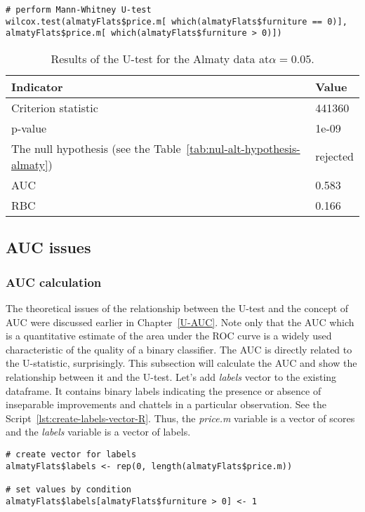 \documentclass[]{scrreprt}
\begin{document}
%
\begin{lstlisting}[float=htp, caption = Running a U-test for data from the city of Almaty., firstnumber=1, label= lst:U-test-R]
# perform Mann-Whitney U-test
wilcox.test(almatyFlats$price.m[ which(almatyFlats$furniture == 0)],
almatyFlats$price.m[ which(almatyFlats$furniture > 0)]) 
\end{lstlisting}
%
\begin{table}[htp]
	\caption{Results of the U-test for the Almaty data at$\alpha=0.05$.}\label{tab:u-test-r-result}
	\centering
	\begin{tabular}{ll}
		\hline
		Indicator&Value\\
		\hline
		Criterion statistic&441360\\
		\hline
		p-value&1e-09\\
		\hline
		The null hypothesis (see the Table~\ref{tab:nul-alt-hypothesis-almaty})&rejected\\
		\hline
		AUC&0.583\\
		\hline
		RBC&0.166\\
		\hline
	\end{tabular}
\end{table}
%
\subsection{AUC issues}
\subsubsection{AUC calculation}\label{AUC-almaty}
The theoretical issues of the relationship between the U-test and the concept of AUC were discussed earlier in Chapter~\ref{U-AUC}. Note only that the AUC which is a quantitative estimate of the area under the ROC curve is a widely used characteristic of the quality of a binary classifier. The AUC is directly related to the U-statistic, surprisingly. This subsection will calculate the AUC and show the relationship between it and the U-test. Let's add \textit{labels} vector to the existing dataframe. It contains binary labels indicating the presence or absence of inseparable improvements and chattels in a particular observation. See the Script~\ref{lst:create-labels-vector-R}. Thus, the \textit{price.m} variable is a vector of scores and the \textit{labels} variable is a vector of labels.
%
\begin{lstlisting}[float=htp, caption = Adding a variable with binary labels. firstnumber=1, label= lst:create-labels-vector-R]
# create vector for labels
almatyFlats$labels <- rep(0, length(almatyFlats$price.m))

# set values by condition
almatyFlats$labels[almatyFlats$furniture > 0] <- 1
\end{lstlisting}
%
\end{document}
